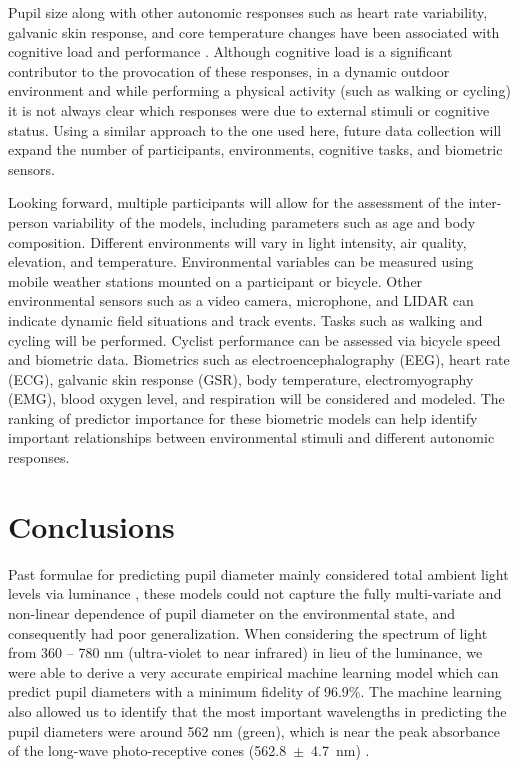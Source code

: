 \documentclass[10pt]{article}
\begin{document}
Pupil size along with other autonomic responses such as heart rate variability, galvanic skin response, and core temperature changes have been associated with cognitive load and performance \cite{PupilLoad1,PupilLoad2,PupilLoad3,PupilLoad4,HRVreview, GSR, tempLoad}. Although cognitive load is a significant contributor to the provocation of these responses, in a dynamic outdoor environment and while performing a physical activity (such as walking or cycling) it is not always clear which responses were due to external stimuli or cognitive status. Using a similar approach to the one used here, future data collection will expand the number of participants, environments, cognitive tasks, and biometric sensors. 

Looking forward, multiple participants will allow for the assessment of the inter-person variability of the models, including parameters such as age and body composition. Different environments will vary in light intensity, air quality, elevation, and temperature. Environmental variables can be measured using mobile weather stations mounted on a participant or bicycle. Other environmental sensors such as a video camera, microphone, and LIDAR can indicate dynamic field situations and track events. Tasks such as walking and cycling will be performed. Cyclist performance can be assessed via bicycle speed and biometric data. Biometrics such as electroencephalography (EEG), heart rate (ECG), galvanic skin response (GSR), body temperature, electromyography (EMG), blood oxygen level, and respiration will be considered and modeled. The ranking of predictor importance for these biometric models can help identify important relationships between environmental stimuli and different autonomic responses.

\section{Conclusions}

Past formulae for predicting pupil diameter mainly considered total ambient light levels via luminance \cite{PupilModels, StanleyPupilMvModel, HolladayPupil1vModel, CrawfordPupil1vModel, MoonPupil1vModel, deGrootPupil1vModel, BlackiePupil1vModel, BartenPupilMvModel}, these models could not capture the fully multi-variate and non-linear dependence of pupil diameter on the environmental state, and consequently had poor generalization. When considering the spectrum of light from 360 -- 780 nm (ultra-violet to near infrared) in lieu of the luminance, we were able to derive a very accurate empirical machine learning model which can predict pupil diameters with a minimum fidelity of 96.9\%. The machine learning also allowed us to identify that the most important wavelengths in predicting the pupil diameters were around 562 nm (green), which is near the peak absorbance of the long-wave photo-receptive cones (\hbox{562.8 $\pm$ 4.7 nm}) \cite{BowmakerCones}.
\end{document}

